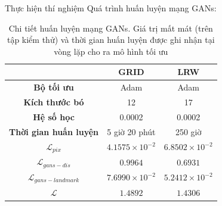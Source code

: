 \begin{frame}{Thực hiện thí nghiệm}
Quá trình huấn luyện mạng GANs:
    \begin{table}[h]
    \centering
    \begin{tabular}{c | c | c}
    \hline 
    &\textbf{GRID} & \textbf{LRW}\\
    \hline
    \textbf{Bộ tối ưu} & Adam & Adam\\
    \textbf{Kích thước bó} & 12 & 17\\
    \textbf{Hệ số học} & 0.0002 & 0.0002\\
    \textbf{Thời gian huấn luyện} & 5 giờ 20 phút & 250 giờ\\
    \textbf{$\mathcal{L}_{pix}$} & $4.1575 \times 10^{-2}$ & $6.8502 \times 10^{-2}$\\
    \textbf{$\mathcal{L}_{gans-dis}$} & $0.9964$ & $0.6931$\\
    \textbf{$\mathcal{L}_{gans-landmark}$} & $7.6990 \times 10^{-2}$ & $5.2412 \times 10^{-2}$\\
    \textbf{$\mathcal{L}$} & $1.4892$ & $1.4306$\\
    \hline
    \end{tabular}
    \caption{Chi tiết huấn luyện mạng GANs. Giá trị mất mát (trên tập kiểm thử) và thời gian huấn luyện được ghi nhận tại vòng lặp cho ra mô hình tối ưu}
    \label{table:gans_training_detail}
\end{table}
\end{frame}


